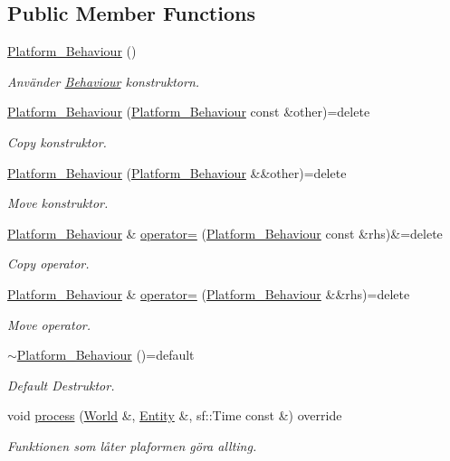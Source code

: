 \subsection*{Public Member Functions}
\begin{DoxyCompactItemize}
\item 
\hyperlink{classPlatform__Behaviour_ae8755b571a2ad73aebb183a6d9ba289b}{Platform\+\_\+\+Behaviour} ()
\begin{DoxyCompactList}\small\item\em Använder \hyperlink{classBehaviour}{Behaviour} konstruktorn. \end{DoxyCompactList}\item 
\hyperlink{classPlatform__Behaviour_aff1ef768551398b8fcae9b765a3b7f44}{Platform\+\_\+\+Behaviour} (\hyperlink{classPlatform__Behaviour}{Platform\+\_\+\+Behaviour} const \&other)=delete
\begin{DoxyCompactList}\small\item\em Copy konstruktor. \end{DoxyCompactList}\item 
\hyperlink{classPlatform__Behaviour_a2f02e74df71cf172120e89ea982ac953}{Platform\+\_\+\+Behaviour} (\hyperlink{classPlatform__Behaviour}{Platform\+\_\+\+Behaviour} \&\&other)=delete
\begin{DoxyCompactList}\small\item\em Move konstruktor. \end{DoxyCompactList}\item 
\hyperlink{classPlatform__Behaviour}{Platform\+\_\+\+Behaviour} \& \hyperlink{classPlatform__Behaviour_aac686ac0c0e8a27ee34d943cf7cf8e99}{operator=} (\hyperlink{classPlatform__Behaviour}{Platform\+\_\+\+Behaviour} const \&rhs)\&=delete
\begin{DoxyCompactList}\small\item\em Copy operator. \end{DoxyCompactList}\item 
\hyperlink{classPlatform__Behaviour}{Platform\+\_\+\+Behaviour} \& \hyperlink{classPlatform__Behaviour_ae5152335d62d30ee7d10d6a7f30b874c}{operator=} (\hyperlink{classPlatform__Behaviour}{Platform\+\_\+\+Behaviour} \&\&rhs)=delete
\begin{DoxyCompactList}\small\item\em Move operator. \end{DoxyCompactList}\item 
\hyperlink{classPlatform__Behaviour_a118ac6c9bd79b02d19d2d8627bee5def}{$\sim$\+Platform\+\_\+\+Behaviour} ()=default
\begin{DoxyCompactList}\small\item\em Default Destruktor. \end{DoxyCompactList}\item 
void \hyperlink{classPlatform__Behaviour_a8a1b458d89bca1e1955aebc2fb44d052}{process} (\hyperlink{classWorld}{World} \&, \hyperlink{classEntity}{Entity} \&, sf\+::\+Time const \&) override
\begin{DoxyCompactList}\small\item\em Funktionen som låter plaformen göra allting. \end{DoxyCompactList}\end{DoxyCompactItemize}
